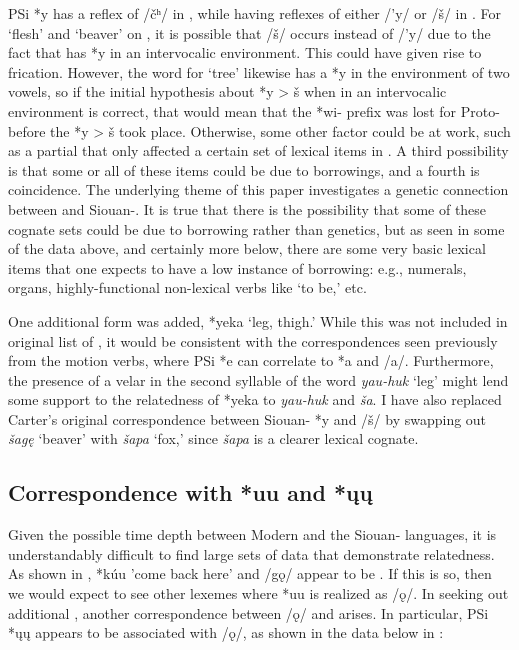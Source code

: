 \documentclass[output=paper]{LSP/langsci}
\begin{document}
PSi *y has a reflex of /\v{c}ʰ/ in , while having reflexes of either /'y/ or /\v{s}/ in . For `flesh' and `beaver' on , it is possible that  /\v{s}/ occurs instead of /'y/ due to the fact that  has *y in an intervocalic environment. This could have given rise to frication. However, the word for `tree' likewise has a *y in the environment of two vowels, so if the initial hypothesis about *y > \v{s} when in an intervocalic environment is correct, that would mean that the *wi- prefix was lost for Proto- before the *y > \v{s}  took place. Otherwise, some other factor could be at work, such as a partial  that only affected a certain set of lexical items in . A third possibility is that some or all of these items could be due to borrowings, and a fourth is coincidence. The underlying theme of this paper investigates a genetic connection between  and Siouan-. It is true that there is the possibility that some of these cognate sets could be due to borrowing rather than genetics, but as seen in some of the data above, and certainly more below, there are some very basic lexical items that one expects to have a low instance of borrowing: e.g., numerals, organs, highly-functional non-lexical verbs like `to be,' etc. 

One additional  form was added, *yeka `leg, thigh.' While this was not included in  original list of , it would be consistent with the correspondences seen previously from the motion verbs, where PSi *e can correlate to  *a and  /a/. Furthermore, the presence of a velar in the second syllable of the  word \emph{yau-huk} `leg' might lend some support to the relatedness of *yeka to  \emph{yau-huk} and  \emph{\v{s}a}. I have also replaced Carter's original correspondence between Siouan- *y and  /\v{s}/ by swapping out \emph{\v{s}ag\k{e}} `beaver' with \emph{\v{s}apa} `fox,' since \emph{\v{s}apa} is a clearer lexical cognate.

\subsection{Correspondence with  *uu and *\k{u}\k{u}}

Given the possible time depth between Modern  and the Siouan- languages, it is understandably difficult to find large sets of data that demonstrate relatedness. As shown in , *k\'uu 'come back here' and  /g\k{o}/ appear to be . If this is so, then we would expect to see other lexemes where *uu is realized as /\k{o}/. In seeking out additional , another correspondence between  /\k{o}/ and  arises. In particular, PSi *\k{u}\k{u} appears to be associated with /\k{o}/, as shown in the data below in :
\end{document}
